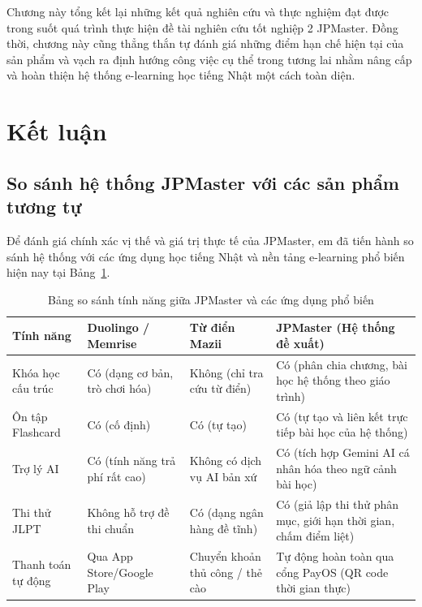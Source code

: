 \documentclass[../DoAn.tex]{subfiles}
\begin{document}
Chương này tổng kết lại những kết quả nghiên cứu và thực nghiệm đạt được trong suốt quá trình thực hiện đề tài nghiên cứu tốt nghiệp 2 JPMaster. Đồng thời, chương này cũng thẳng thắn tự đánh giá những điểm hạn chế hiện tại của sản phẩm và vạch ra định hướng công việc cụ thể trong tương lai nhằm nâng cấp và hoàn thiện hệ thống e-learning học tiếng Nhật một cách toàn diện.

\section{Kết luận}

\subsection{So sánh hệ thống JPMaster với các sản phẩm tương tự}
Để đánh giá chính xác vị thế và giá trị thực tế của JPMaster, em đã tiến hành so sánh hệ thống với các ứng dụng học tiếng Nhật và nền tảng e-learning phổ biến hiện nay tại Bảng~\ref{tab:comparison}.

\begin{table}[H]
\centering
\renewcommand{\arraystretch}{1.25}
\begin{tabular}{|p{2.2cm}|p{3.0cm}|p{3.0cm}|p{3.8cm}|}
\hline
\textbf{Tính năng} & \textbf{Duolingo / Memrise} & \textbf{Từ điển Mazii} & \textbf{JPMaster (Hệ thống đề xuất)} \\
\hline
Khóa học cấu trúc & Có (dạng cơ bản, trò chơi hóa) & Không (chỉ tra cứu từ điển) & Có (phân chia chương, bài học hệ thống theo giáo trình) \\
\hline
Ôn tập Flashcard & Có (cố định) & Có (tự tạo) & Có (tự tạo và liên kết trực tiếp bài học của hệ thống) \\
\hline
Trợ lý AI & Có (tính năng trả phí rất cao) & Không có dịch vụ AI bản xứ & Có (tích hợp Gemini AI cá nhân hóa theo ngữ cảnh bài học) \\
\hline
Thi thử JLPT & Không hỗ trợ đề thi chuẩn & Có (dạng ngân hàng đề tĩnh) & Có (giả lập thi thử phân mục, giới hạn thời gian, chấm điểm liệt) \\
\hline
Thanh toán tự động & Qua App Store/Google Play & Chuyển khoản thủ công / thẻ cào & Tự động hoàn toàn qua cổng PayOS (QR code thời gian thực) \\
\hline
\end{tabular}
\caption{Bảng so sánh tính năng giữa JPMaster và các ứng dụng phổ biến}
\label{tab:comparison}
\end{table}
\end{document}
